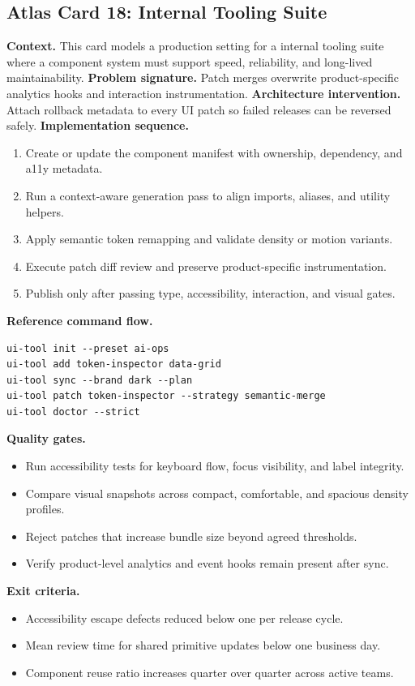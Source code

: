\subsection*{Atlas Card 18: Internal Tooling Suite}
\textbf{Context.} This card models a production setting for a internal tooling suite where a component system must support speed, reliability, and long-lived maintainability.
\textbf{Problem signature.} Patch merges overwrite product-specific analytics hooks and interaction instrumentation.
\textbf{Architecture intervention.} Attach rollback metadata to every UI patch so failed releases can be reversed safely.
\textbf{Implementation sequence.}
\begin{enumerate}[leftmargin=*, itemsep=0.28em]
  \item Create or update the component manifest with ownership, dependency, and a11y metadata.
  \item Run a context-aware generation pass to align imports, aliases, and utility helpers.
  \item Apply semantic token remapping and validate density or motion variants.
  \item Execute patch diff review and preserve product-specific instrumentation.
  \item Publish only after passing type, accessibility, interaction, and visual gates.
\end{enumerate}
\textbf{Reference command flow.}
\begin{verbatim}
ui-tool init --preset ai-ops
ui-tool add token-inspector data-grid
ui-tool sync --brand dark --plan
ui-tool patch token-inspector --strategy semantic-merge
ui-tool doctor --strict
\end{verbatim}
\textbf{Quality gates.}
\begin{itemize}[leftmargin=*, itemsep=0.24em]
  \item Run accessibility tests for keyboard flow, focus visibility, and label integrity.
  \item Compare visual snapshots across compact, comfortable, and spacious density profiles.
  \item Reject patches that increase bundle size beyond agreed thresholds.
  \item Verify product-level analytics and event hooks remain present after sync.
\end{itemize}
\textbf{Exit criteria.}
\begin{itemize}[leftmargin=*, itemsep=0.24em]
  \item Accessibility escape defects reduced below one per release cycle.
  \item Mean review time for shared primitive updates below one business day.
  \item Component reuse ratio increases quarter over quarter across active teams.
\end{itemize}
\clearpage
